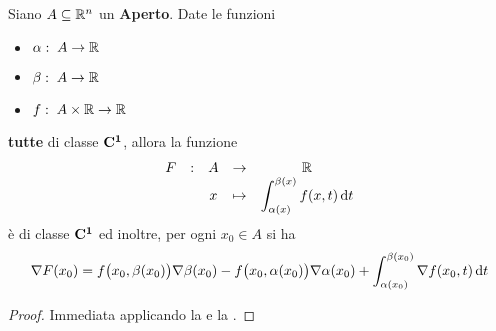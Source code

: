 \begin{corollary}
	Siano $A \subseteq \mathbb{R}^n$ un \textbf{Aperto}. Date le funzioni
	\begin{itemize}[noitemsep]
		\item $\alpha:\; A \to \mathbb{R}$
		\item $\beta:\; A \to \mathbb{R}$
		\item $f:\; A \times \mathbb{R} \to \mathbb{R}$
	\end{itemize}
	\textbf{tutte} di classe $\mathbf{C^{1}}$, allora la funzione
	\[\begin{array}{ccccc} {F} & : & {A} & \to & {\mathbb{R}} \\ & & {x} & \mapsto & {\displaystyle\int_{\alpha(x)}^{\beta(x)} f(x,t)\,\mathrm{d}{t}} \\ \end{array}\]
	è di classe $\mathbf{C^{1}}$ ed inoltre, per ogni $x_0 \in A$ si ha
	\[
		\nabla F(x_0) =
		f \bigl( x_0, \beta(x_0) \bigr) \nabla \beta(x_0) -
		f \bigl( x_0, \alpha(x_0) \bigr) \nabla \alpha(x_0) +
		\int_{\alpha(x_0)}^{\beta(x_0)} \nabla f(x_0, t) \,\mathrm{d}{t}
	\]
	\begin{proof}
		Immediata applicando la  e la .
	\end{proof}
\end{corollary}
\cbend

\newpage
